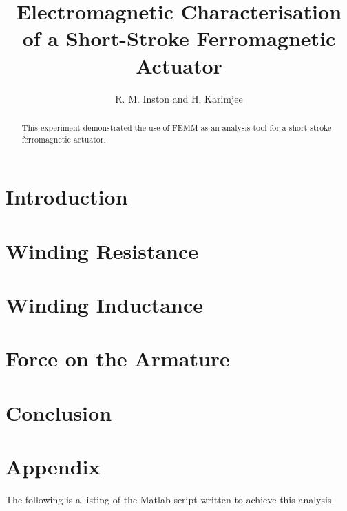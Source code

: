 \documentclass[a4paper]{IEEEtran}
\begin{document}
\title{Electromagnetic Characterisation of a Short-Stroke Ferromagnetic Actuator}
\author{R. M. Inston and H. Karimjee}

\maketitle
\begin{abstract}
This experiment demonstrated the use of FEMM as an analysis tool for a short stroke ferromagnetic actuator. 
\end{abstract}

\section{Introduction}

\section{Winding Resistance}

\section{Winding Inductance}

\section{Force on the Armature}

\section{Conclusion}

\pagebreak
\onecolumn
\section{Appendix}
The following is a listing of the Matlab script written to achieve this analysis.

\end{document}
